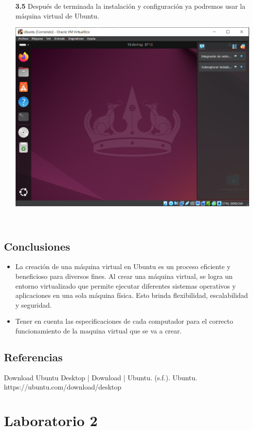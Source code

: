 \documentclass[11pt,twoside]{book}
\begin{document}
\begin{enumerate}
\begin{enumerate}
     \item[\textbf{3.5}] Después de terminada la instalación y configuración ya podremos usar la máquina virtual de Ubuntu.

    \begin{minipage}{\linewidth}
        \centering
        \includegraphics[width=0.4\linewidth]{Ubt.png}
        \label{fig:etiqueta}
    \end{minipage}\\
    


\end{enumerate}

\subsection*{Conclusiones}
\begin{itemize}
  \item La creación de una máquina virtual en Ubuntu es un proceso eficiente y beneficioso para diversos fines. Al crear una máquina virtual, se logra un entorno virtualizado que permite ejecutar diferentes sistemas operativos y aplicaciones en una sola máquina física. Esto brinda flexibilidad, escalabilidad y seguridad.
  \item Tener en cuenta las especificaciones de cada computador para el correcto funcionamiento de la maquina virtual que se va a crear.
\end{itemize}

\subsection*{Referencias}
Download Ubuntu Desktop | Download | Ubuntu. (s.f.). Ubuntu. https://ubuntu.com/download/desktop 
\end{enumerate}

\section{Laboratorio 2}
\end{document}
